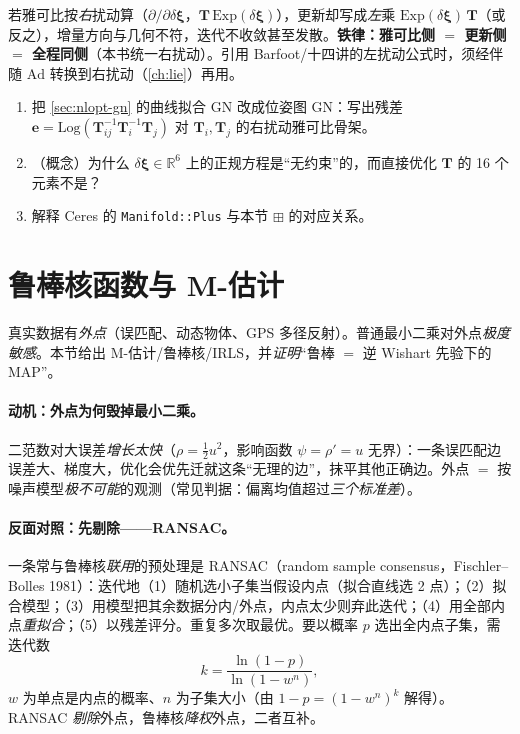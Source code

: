 \begin{pitfall}
若雅可比按\emph{右}扰动算（$\partial/\partial\delta\boldsymbol{\xi}$，$\mathbf{T}\,\mathrm{Exp}(\delta\boldsymbol{\xi})$），更新却写成\emph{左}乘 $\mathrm{Exp}(\delta\boldsymbol{\xi})\,\mathbf{T}$（或反之），增量方向与几何不符，迭代不收敛甚至发散。\textbf{铁律：雅可比侧 $=$ 更新侧 $=$ 全程同侧}（本书统一右扰动）。引用 Barfoot/十四讲的左扰动公式时，须经伴随 $\mathrm{Ad}$ 转换到右扰动（\cref{ch:lie}）再用。
\end{pitfall}

\begin{practice}
\begin{enumerate}
  \item 把 \cref{sec:nlopt-gn} 的曲线拟合 GN 改成位姿图 GN：写出残差 $\mathbf{e}=\mathrm{Log}(\mathbf{T}_{ij}^{-1}\mathbf{T}_i^{-1}\mathbf{T}_j)$ 对 $\mathbf{T}_i,\mathbf{T}_j$ 的右扰动雅可比骨架。
  \item （概念）为什么 $\delta\boldsymbol{\xi}\in\mathbb{R}^6$ 上的正规方程是“无约束”的，而直接优化 $\mathbf{T}$ 的 16 个元素不是？
  \item 解释 Ceres 的 \texttt{Manifold::Plus} 与本节 $\boxplus$ 的对应关系。
\end{enumerate}
\end{practice}

\section{鲁棒核函数与 M-估计}
\label{sec:nlopt-robust}

真实数据有\emph{外点}（误匹配、动态物体、GPS 多径反射）。普通最小二乘对外点\emph{极度敏感}。本节给出 M-估计/鲁棒核/IRLS，并\emph{证明}“鲁棒 $=$ 逆 Wishart 先验下的 MAP”。

\paragraph{动机：外点为何毁掉最小二乘。}\cite{gaoxiang2019slam14,barfoot2024state}
二范数对大误差\emph{增长太快}（$\rho=\tfrac12u^2$，影响函数 $\psi=\rho'=u$ 无界）：一条误匹配边误差大、梯度大，优化会优先迁就这条“无理的边”，抹平其他正确边。外点 $=$ 按噪声模型\emph{极不可能}的观测（常见判据：偏离均值超过\emph{三个标准差}）\cite{barfoot2024state}。

\paragraph{反面对照：先剔除——RANSAC。}\cite{barfoot2024state}
一条常与鲁棒核\emph{联用}的预处理是 RANSAC（random sample consensus，Fischler--Bolles 1981）：迭代地（1）随机选小子集当假设内点（拟合直线选 2 点）；（2）拟合模型；（3）用模型把其余数据分内/外点，内点太少则弃此迭代；（4）用全部内点\emph{重拟合}；（5）以残差评分。重复多次取最优。要以概率 $p$ 选出全内点子集，需迭代数
\begin{equation}
  k=\frac{\ln(1-p)}{\ln(1-w^n)},
  \label{eq:nlopt-ransac}
\end{equation}
$w$ 为单点是内点的概率、$n$ 为子集大小（由 $1-p=(1-w^n)^k$ 解得）。RANSAC \emph{剔除}外点，鲁棒核\emph{降权}外点，二者互补。

